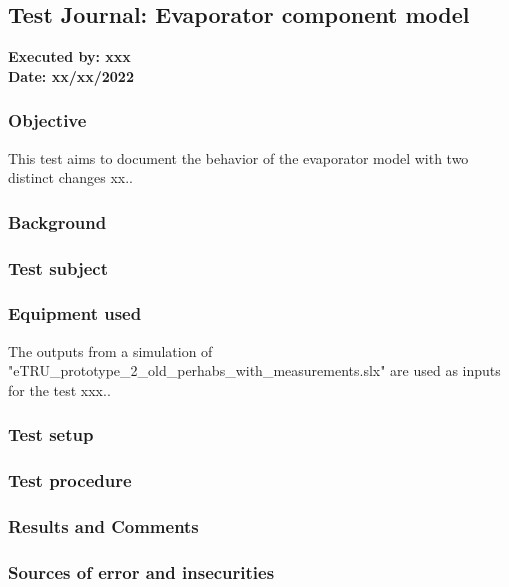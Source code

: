 \subsection{Test Journal: Evaporator component model} \label{app:tj_00} %

\textbf{Executed by: xxx} \\
\textbf{Date: xx/xx/2022}

\subsubsection{Objective}
This test aims to document the behavior of the evaporator model with two distinct changes xx..

\subsubsection{Background}


\subsubsection{Test subject}
  

\subsubsection{Equipment used}
The outputs from a simulation of "eTRU\_prototype\_2\_old\_perhabs\_with\_measurements.slx" are used as inputs for the test xxx..

\subsubsection{Test setup}


\subsubsection{Test procedure}



\subsubsection{Results and Comments}


\subsubsection{Sources of error and insecurities}
